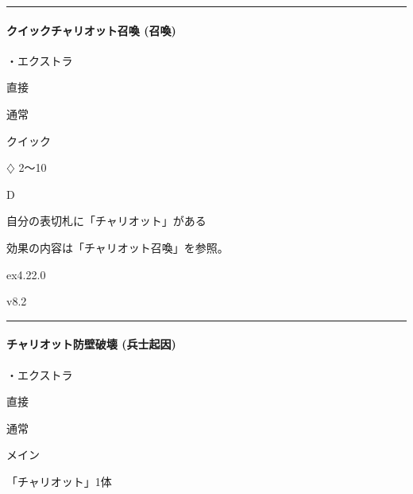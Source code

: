 \documentclass[letterpaper,10pt,dvipdfmx]{sphinxmanual}
\begin{document}
\bigskip\hrule\bigskip



\paragraph{クイックチャリオット召喚 (召喚)}
\label{\detokenize{auto/frameActionlist:act-quicksummonchariot}}\label{\detokenize{auto/frameActionlist:id46}}
\sphinxAtStartPar
{}

\sphinxAtStartPar
・エクストラ

\sphinxAtStartPar
{} 直接

\sphinxAtStartPar
{} 通常

\sphinxAtStartPar
{} クイック

\sphinxAtStartPar
{} {\normalsize $\diamondsuit$} 2〜10

\sphinxAtStartPar
{} D

\sphinxAtStartPar
{}

\sphinxAtStartPar
自分の表切札に「チャリオット」がある

\sphinxAtStartPar
{}

\sphinxAtStartPar
効果の内容は「チャリオット召喚」を参照。

\sphinxAtStartPar
{}  ex4.22.0

\sphinxAtStartPar
{}  v8.2


\bigskip\hrule\bigskip



\paragraph{チャリオット防壁破壊 (兵士起因)}
\label{\detokenize{auto/frameActionlist:act-chariotdestroy}}\label{\detokenize{auto/frameActionlist:id47}}
\sphinxAtStartPar
{}

\sphinxAtStartPar
・エクストラ

\sphinxAtStartPar
{} 直接

\sphinxAtStartPar
{} 通常

\sphinxAtStartPar
{} メイン

\sphinxAtStartPar
{} 「チャリオット」1体
\end{document}

